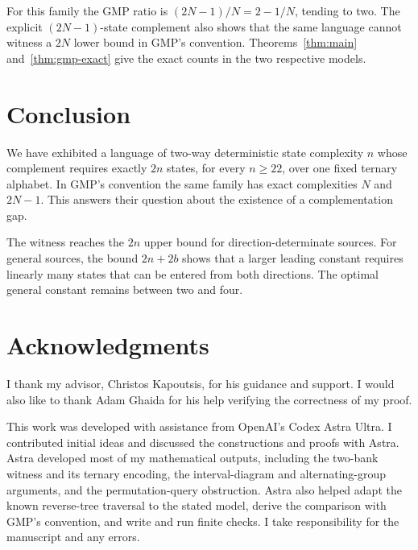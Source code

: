 \documentclass[11pt,a4paper]{article}
\theoremstyle{definition}
\theoremstyle{remark}
\begin{document}
For this family the GMP ratio is $(2N-1)/N=2-1/N$, tending to two.
The explicit $(2N-1)$-state complement also shows that the same
language cannot witness a $2N$ lower bound in GMP's convention.
Theorems~\ref{thm:main} and~\ref{thm:gmp-exact} give the exact
counts in the two respective models.

\section{Conclusion}

We have exhibited a language of two-way deterministic state complexity
$n$ whose complement requires exactly $2n$ states, for every $n\ge22$,
over one fixed ternary alphabet. In GMP's convention the same family
has exact complexities $N$ and $2N-1$. This answers their question
about the existence of a complementation gap.

The witness reaches the $2n$ upper bound for direction-determinate
sources. For general sources, the bound $2n+2b$ shows that a larger
leading constant requires linearly many states that can be entered
from both directions. The optimal general constant remains between
two and four.

\section*{Acknowledgments}
I thank my advisor, Christos Kapoutsis, for his guidance and support.
I would also like to thank Adam Ghaida for his help verifying the
correctness of my proof.

This work was developed with assistance from OpenAI's Codex Astra Ultra.
I contributed initial ideas and discussed the constructions and proofs
with Astra. Astra developed most of my mathematical outputs, including the two-bank witness and its ternary encoding, the
interval-diagram and alternating-group arguments, and the
permutation-query obstruction. Astra also helped adapt the known
reverse-tree traversal to the stated model, derive the comparison
with GMP's convention, and write and run finite checks. I take responsibility for the manuscript and
any errors.



\end{document}
